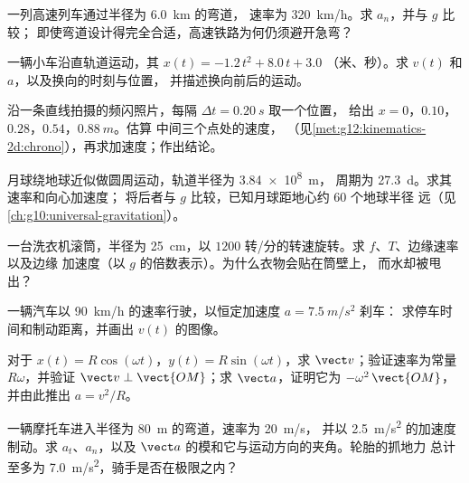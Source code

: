 \begin{exercise}[$\star\star$]\label{exo:g12:kinematics-2d:6}
一列高速列车通过半径为 \qty{6.0}{km} 的弯道，
速率为 \qty{320}{km/h}。求 $a_n$，并与 $g$ 比较；
即使弯道设计得完全合适，高速铁路为何仍须避开急弯？
\end{exercise}

\begin{exercise}[$\star\star$]\label{exo:g12:kinematics-2d:7}
一辆小车沿直轨道运动，其 $x(t) = -1.2\,t^2 + 8.0\,t + 3.0$
（米、秒）。求 $v(t)$ 和 $a$，以及换向的时刻与位置，
并描述换向前后的运动。
\end{exercise}

\begin{exercise}[$\star\star$]\label{exo:g12:kinematics-2d:8}
沿一条直线拍摄的频闪照片，每隔 $\Delta t = \qty{0.20}{s}$ 取一个位置，
给出 $x = 0$，$0.10$，$0.28$，$0.54$，$\qty{0.88}{m}$。估算
中间三个点处的速度，
（见\cref{met:g12:kinematics-2d:chrono}），再求加速度；作出结论。
\end{exercise}

\begin{exercise}[$\star\star$]\label{exo:g12:kinematics-2d:9}
月球绕地球近似做圆周运动，轨道半径为 \qty{3.84e8}{m}，
周期为 \qty{27.3}{d}。求其速率和向心加速度；
将后者与 $g$ 比较，已知月球距地心约 $60$ 个地球半径
远（见\cref{ch:g10:universal-gravitation}）。
\end{exercise}

\begin{exercise}[$\star\star$]\label{exo:g12:kinematics-2d:10}
一台洗衣机滚筒，半径为 \qty{25}{cm}，以 $1200$
转/分的转速旋转。求 $f$、$T$、边缘速率以及边缘
加速度（以 $g$ 的倍数表示）。为什么衣物会贴在筒壁上，
而水却被甩出？
\end{exercise}

\begin{exercise}[$\star\star$]\label{exo:g12:kinematics-2d:11}
一辆汽车以 \qty{90}{km/h} 的速率行驶，以恒定加速度 $a = \qty{7.5}{m/s^2}$ 刹车：
求停车时间和制动距离，并画出 $v(t)$ 的图像。
\end{exercise}

\begin{exercise}[$\star\star\star$]\label{exo:g12:kinematics-2d:12}
对于 $x(t) = R\cos(\omega t)$，$y(t) = R\sin(\omega t)$，求
$\vect v$；验证速率为常量 $R\omega$，并验证
$\vect v \perp \vect{OM}$；求 $\vect a$，证明它为
$-\omega^2\,\vect{OM}$，并由此推出 $a = v^2/R$。
\end{exercise}

\begin{exercise}[$\star\star\star$]\label{exo:g12:kinematics-2d:13}
一辆摩托车进入半径为 \qty{80}{m} 的弯道，速率为 \qty{20}{m/s}，
并以 \qty{2.5}{m/s^2} 的加速度制动。求 $a_t$、$a_n$，以及
$\vect a$ 的模和它与运动方向的夹角。轮胎的抓地力
总计至多为 \qty{7.0}{m/s^2}，骑手是否在极限之内？
\end{exercise}

